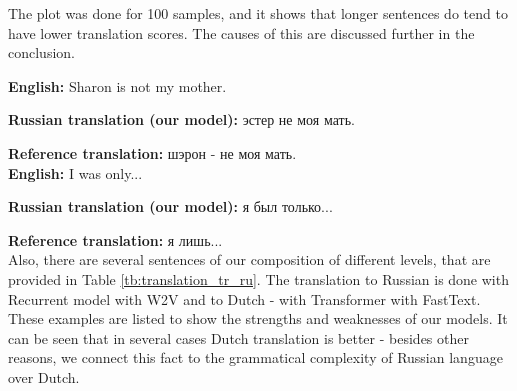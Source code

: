\documentclass{article}
\begin{document}
The plot was done for 100 samples, and it shows that longer sentences do tend to have lower translation scores. The causes of this are discussed further in the conclusion.


\textbf{English:} Sharon is not my mother.

\textbf{Russian translation (our model):} эстер не моя мать.

\textbf{Reference translation:} шэрон - не моя мать.\\

\textbf{English:} I was only...

\textbf{Russian translation (our model):} я был только...

\textbf{Reference translation:} я лишь...\\

Also, there are several sentences of our composition of different levels, that are provided in Table \ref{tb:translation_tr_ru}. The translation to Russian is done with Recurrent model with W2V and to Dutch - with Transformer with FastText. These examples are listed to show the strengths and weaknesses of our models. It can be seen that in several cases Dutch translation is better - besides other reasons, we connect this fact to the grammatical complexity of Russian language over Dutch.
\end{document}
